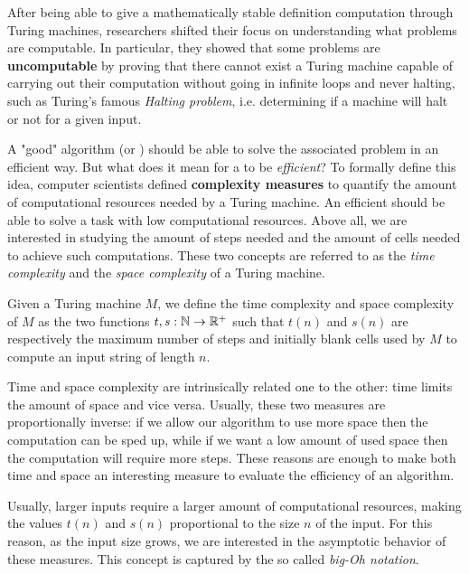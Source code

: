After being able to give a mathematically stable definition computation through Turing machines, researchers shifted their focus on understanding what problems are computable. In particular, they showed that some problems are \textbf{uncomputable} by proving that there cannot exist a Turing machine capable of carrying out their computation without going in infinite loops and never halting, such as Turing's famous \textit{Halting problem}, i.e. determining if a machine will halt or not for a given input.

A "good" algorithm (or \TM) should be able to solve the associated problem in an efficient way. But what does it mean for a \TM to be \textit{efficient}? To formally define this idea, computer scientists  defined \textbf{complexity measures} to quantify the amount of computational resources needed by a Turing machine. An efficient \TM should be able to solve a task with low computational resources. Above all, we are interested in studying the amount of steps needed and the amount of cells needed to achieve such computations. These two concepts are referred to as the \textit{time complexity} and the \textit{space complexity} of a Turing machine.

\begin{definition}
    Given a Turing machine $M$, we define the time complexity and space complexity of $M$ as the two functions $t, s : \mathbb{N} \to \mathbb{R}^+$ such that $t(n)$ and $s(n)$ are respectively the maximum number of steps and initially blank cells used by $M$ to compute an input string of length $n$.
\end{definition}

Time and space complexity are intrinsically related one to the other: time limits the amount of space and vice versa. Usually, these two measures are proportionally inverse: if we allow our algorithm to use more space then the computation can be sped up, while if we want a low amount of used space then the computation will require more steps. These reasons are enough to make both time and space an interesting measure to evaluate the efficiency of an algorithm.

Usually, larger inputs require a larger amount of computational resources, making the values $t(n)$ and $s(n)$ proportional to the size $n$ of the input. For this reason, as the input size grows, we are interested in the asymptotic behavior of these measures. This concept is captured by the so called \textit{big-Oh notation}.

